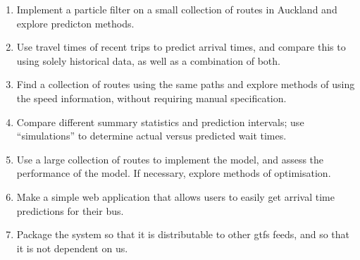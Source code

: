\documentclass[12pt,a4paper]{article}
\newcommand{\pf}{particle filter}
\begin{document}










\begin{enumerate}
\item
  Implement a \pf{} on a small collection of routes in Auckland and explore predicton methods.

\item
  Use travel times of recent trips to predict arrival times,
  and compare this to using solely historical data, as well as a combination of both.

\item 
  Find a collection of routes using the same paths and explore methods of using the speed information,
  without requiring manual specification.

\item
  Compare different summary statistics and prediction intervals;
  use ``simulations'' to determine actual versus predicted wait times.

\item
  Use a large collection of routes to implement the model, and assess the performance of the model. 
  If necessary, explore methods of optimisation.

\item
  Make a simple web application that allows users to easily get arrival time predictions for their bus.
  
\item
  Package the system so that it is distributable to other \gls{gtfs} feeds,
  and so that it is not dependent on us.

\end{enumerate}
\end{document}
